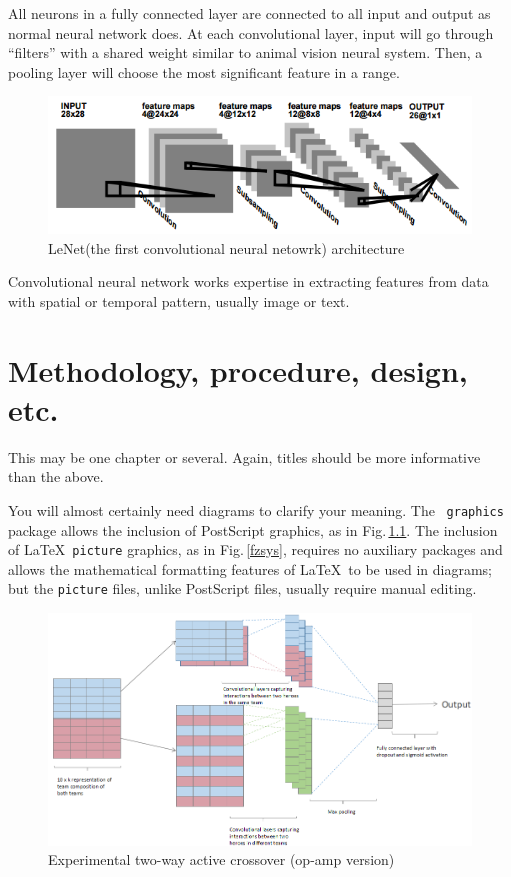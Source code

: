 \documentclass[12pt,openany,a4paper]{book}
\newcommand{\fig}[1]  {Fig.\,\ref{#1}}		%
\begin{document}
All neurons in a fully connected layer are connected to all input and output as normal neural network does. At each convolutional layer, input will go through “filters” with  a shared weight similar to animal vision neural system. Then, a pooling layer will choose the most significant feature in a range.\\

\begin{figure}[htbp]
\centerline{\includegraphics{conv.png}}
\caption{LeNet(the first convolutional neural netowrk) architecture\cite{lecun1995convolutional}}
\label{flr1}
\end{figure}

Convolutional neural network works expertise in extracting features from data with spatial or temporal pattern, usually image or text. 

\chapter{Methodology, procedure, design, etc.}

This may be one chapter or several.  Again, titles should be more
informative than the above.

You will almost certainly need diagrams to clarify your meaning.  The
\LaTeXe\ \texttt{graphics} package allows the inclusion of PostScript
graphics, as in \fig{flr1}.  The inclusion of \LaTeX\ \texttt{picture}
graphics, as in \fig{fzsys}, requires no auxiliary packages and allows
the mathematical formatting features of \LaTeX\ to be used in
diagrams; but the \texttt{picture} files, unlike PostScript files,
usually require manual editing.

\begin{figure}[htbp]
\centerline{\includegraphics{architecture.png}}
\caption{Experimental two-way active crossover (op-amp version)}
\label{flr1}
\end{figure}
\end{document}
